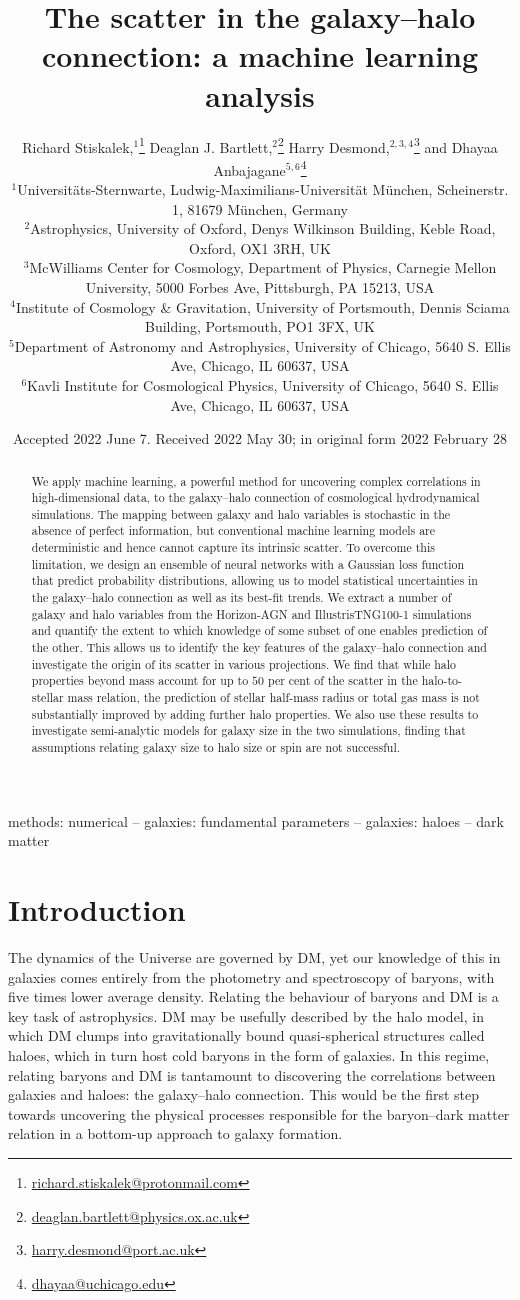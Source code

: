 \documentclass[usenatbib,useAMS]{mnras}
\title[The scatter in the galaxy--halo connection]{The scatter in the galaxy--halo connection: a machine learning analysis}
\author[R. Stiskalek et al.]
{Richard Stiskalek,$^{1}$\thanks{\href{mailto:richard.stiskalek@protonmail.com}{richard.stiskalek@protonmail.com}} 
Deaglan J. Bartlett,$^{2}$\thanks{\href{mailto:deaglan.bartlett@physics.ox.ac.uk}{deaglan.bartlett@physics.ox.ac.uk}}
Harry Desmond,$^{2,3,4}$\thanks{\href{mailto:harry.desmond@port.ac.uk}{harry.desmond@port.ac.uk}}
and Dhayaa Anbajagane$^{5,6}$\thanks{\href{mailto:dhayaa@uchicago.edu}{dhayaa@uchicago.edu}}
\\ 
% 
$^{1}$Universit\"{a}ts-Sternwarte, Ludwig-Maximilians-Universit\"{a}t M\"{u}nchen, Scheinerstr. 1, 81679 München, Germany\\
$^{2}$Astrophysics, University of Oxford, Denys Wilkinson Building, Keble Road, Oxford, OX1 3RH, UK\\
$^{3}$McWilliams Center for Cosmology, Department of Physics, Carnegie Mellon University, 5000 Forbes Ave, Pittsburgh, PA 15213, USA\\
$^4$Institute of Cosmology \& Gravitation, University of Portsmouth, Dennis Sciama Building, Portsmouth, PO1 3FX, UK\\
$^5$Department of Astronomy and Astrophysics, University of Chicago, 5640 S. Ellis Ave, Chicago, IL 60637, USA\\
$^6$Kavli Institute for Cosmological Physics, University of Chicago, 5640 S. Ellis Ave, Chicago, IL 60637, USA
}
\date{Accepted 2022 June 7. Received 2022 May 30; in original form 2022 February 28}
\newcommand{\hd}[1]{\textcolor{purple}{[{\bf HD says}: #1]}}
\begin{document}
\label{firstpage}
\pagerange{\pageref{firstpage}--\pageref{lastpage}}
\maketitle

\begin{abstract}
We apply machine learning, a powerful method for uncovering complex correlations in high-dimensional data, to the galaxy--halo connection of cosmological hydrodynamical simulations. The mapping between galaxy and halo variables is stochastic in the absence of perfect information, but conventional machine learning models are deterministic and hence cannot capture its intrinsic scatter. To overcome this limitation, we design an ensemble of neural networks with a Gaussian loss function that predict probability distributions, allowing us to model statistical uncertainties in the galaxy--halo connection as well as its best-fit trends. We extract a number of galaxy and halo variables from the Horizon-AGN and IllustrisTNG100-1 simulations and quantify the extent to which knowledge of some subset of one enables prediction of the other. This allows us to identify the key features of the galaxy--halo connection and investigate the origin of its scatter in various projections. We find that while halo properties beyond mass account for up to $50$ per cent of the scatter in the halo-to-stellar mass relation, the prediction of stellar half-mass radius or total gas mass is not substantially improved by adding further halo properties. We also use these results to investigate semi-analytic models for galaxy size in the two simulations, finding that assumptions relating galaxy size to halo size or spin are not successful.
\end{abstract}


\begin{keywords}
methods: numerical -- galaxies: fundamental parameters -- galaxies: haloes -- dark matter
\end{keywords}



\section{Introduction}\label{sec:Introduction}

The dynamics of the Universe are governed by \ac{DM}, yet our knowledge of this in galaxies comes entirely from the photometry and spectroscopy of baryons, with five times lower average density. Relating the behaviour of baryons and \ac{DM} is a key task of astrophysics. \ac{DM} may be usefully described by the halo model, in which \ac{DM} clumps into gravitationally bound quasi-spherical structures called haloes, which in turn host cold baryons in the form of galaxies. In this regime, relating baryons and \ac{DM} is tantamount to discovering the correlations between galaxies and haloes: the galaxy--halo connection. This would be the first step towards uncovering the physical processes responsible for the baryon--dark matter relation in a bottom-up approach to galaxy formation.
\end{document}
